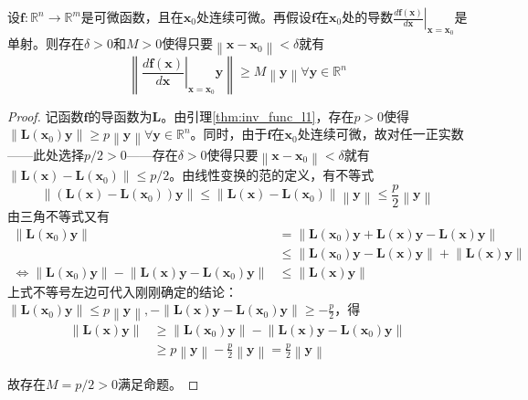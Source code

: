 \documentclass[main.tex]{subfiles}
\begin{document}
\begin{lemma}\label{thm:inv_func_l2}
设$\mathbf{f}:\mathbb{R}^n\rightarrow\mathbb{R}^m$是可微函数，且在$\mathbf{x}_0$处连续可微。再假设$\mathbf{f}$在$\mathbf{x}_0$处的导数$\left.\frac{d\mathbf{f}\left(\mathbf{x}\right)}{d\mathbf{x}}\right|_{\mathbf{x}=\mathbf{x}_0}$是单射。则存在$\delta>0$和$M>0$使得只要$\left\|\mathbf{x}-\mathbf{x}_0\right\|<\delta$就有
\[
\left\|\left.\frac{d\mathbf{f}\left(\mathbf{x}\right)}{d\mathbf{x}}\right|_{\mathbf{x}=\mathbf{x}_0}\mathbf{y}\right\|\geq M\left\|\mathbf{y}\right\|\forall\mathbf{y}\in\mathbb{R}^n
\]
\end{lemma}
\begin{proof}
记函数$\mathbf{f}$的导函数为$\mathbf{L}$。由引理\ref{thm:inv_func_l1}，存在$p>0$使得$\left\|\mathbf{L}\left(\mathbf{x}_0\right)\mathbf{y}\right\|\geq p\left\|\mathbf{y}\right\|\forall\mathbf{y}\in\mathbb{R}^n$。同时，由于$\mathbf{f}$在$\mathbf{x}_0$处连续可微，故对任一正实数——此处选择$p/2>0$——存在$\delta>0$使得只要$\left\|\mathbf{x}-\mathbf{x}_0\right\|<\delta$就有$\left\|\mathbf{L}\left(\mathbf{x}\right)-\mathbf{L}\left(\mathbf{x}_0\right)\right\|\leq p/2$。由线性变换的范的定义，有不等式
\[
\left\|\left(\mathbf{L}\left(\mathbf{x}\right)-\mathbf{L}\left(\mathbf{x}_0\right)\right)\mathbf{y}\right\|\leq\left\|\mathbf{L}\left(\mathbf{x}\right)-\mathbf{L}\left(\mathbf{x}_0\right)\right\|\left\|\mathbf{y}\right\|\leq\frac{p}{2}\left\|\mathbf{y}\right\|\]
由三角不等式又有
\begin{align*}
\left\|\mathbf{L}\left(\mathbf{x}_0\right)\mathbf{y}\right\|&=\left\|\mathbf{L}\left(\mathbf{x}_0\right)\mathbf{y}+\mathbf{L}\left(\mathbf{x}\right)\mathbf{y}-\mathbf{L}\left(\mathbf{x}\right)\mathbf{y}\right\|\\
&\leq\left\|\mathbf{L}\left(\mathbf{x}_0\right)\mathbf{y}-\mathbf{L}\left(\mathbf{x}\right)\mathbf{y}\right\|+\left\|\mathbf{L}\left(\mathbf{x}\right)\mathbf{y}\right\|\\
\Leftrightarrow\left\|\mathbf{L}\left(\mathbf{x}_0\right)\mathbf{y}\right\|-\left\|\mathbf{L}\left(\mathbf{x}\right)\mathbf{y}-\mathbf{L}\left(\mathbf{x}_0\right)\mathbf{y}\right\|&\leq\left\|\mathbf{L}\left(\mathbf{x}\right)\mathbf{y}\right\|
\end{align*}
上式不等号左边可代入刚刚确定的结论：$\left\|\mathbf{L}\left(\mathbf{x}_0\right)\mathbf{y}\right\|\leq p\left\|\mathbf{y}\right\|, -\left\|\mathbf{L}\left(\mathbf{x}\right)\mathbf{y}-\mathbf{L}\left(\mathbf{x}_0\right)\mathbf{y}\right\|\geq-\frac{p}{2}$，得
\begin{align*}
\left\|\mathbf{L}\left(\mathbf{x}\right)\mathbf{y}\right\|&\geq\left\|\mathbf{L}\left(\mathbf{x}_0\right)\mathbf{y}\right\|-\left\|\mathbf{L}\left(\mathbf{x}\right)\mathbf{y}-\mathbf{L}\left(\mathbf{x}_0\right)\mathbf{y}\right\|\\
&\geq p\left\|\mathbf{y}\right\|-\frac{p}{2}\left\|\mathbf{y}\right\|=\frac{p}{2}\left\|\mathbf{y}\right\|
\end{align*}

故存在$M=p/2>0$满足命题。
\end{proof}
\end{document}
